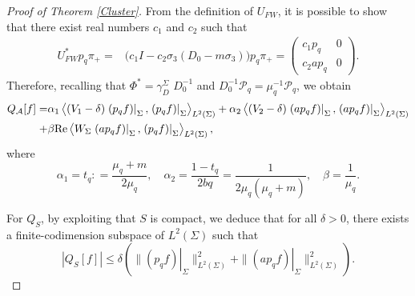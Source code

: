\documentclass[11pt,a4paper,reqno,oneside]{amsproc}
\numberwithin{equation}{section}
\begin{document}
\begin{proof}[Proof of Theorem \ref{Cluster}]
From the definition of $U_{FW}$, it is possible to show that there exist real numbers $c_1$ and $c_2$ such that
\begin{align*}
{U}_{FW}^* {p}_q \pi_+=&
\bigl(c_1 I - c_2 \sigma_3 (D_0 - m \sigma_3)\bigr)p_q \pi_+
=
\begin{pmatrix}
c_1p_q & 0 \\
c_2ap_q & 0
\end{pmatrix}.
\end{align*}
Therefore, recalling  that $\Phi^{*}=\gamma^\Sigma_D\,\,D_{0}^{-1}$ and $D_{0}^{-1}\mathcal{P}_q = \mu_q^{-1}\mathcal{P}_q$,  we obtain
\begin{align*}
Q_{\mathcal A}[f]
=&\alpha _1
\left\langle 
(V_1-\delta) \left.(p_q f)\right|_{\Sigma},
\left.(p_q f)\right|_{\Sigma}
\right\rangle_{L^2(\Sigma)}
+\alpha _2
\left\langle 
(V_2 -\delta) \left.(ap_q f)\right|_{\Sigma},
\left.(ap_q f)\right|_{\Sigma}
\right\rangle_{L^2(\Sigma)}\\
+&{\beta}
{\rm Re}
\left\langle 
W_\Sigma \left.(ap_q f)\right|_{\Sigma},
\left.(p_q f)\right|_{\Sigma}
\right\rangle_{L^2(\Sigma)},
\end{align*}
where 
\[
\alpha_1 = t_q : = \frac{\mu_q+m}{2\mu_q}, \quad 
\alpha_2 = \frac{1-t_q}{2bq} = \frac{1}{2\mu_q(\mu_q+m)}, \quad 
\beta = \frac{1}{\mu_q}.
\]

For $Q_S$, by exploiting that $S$ is compact, we deduce that for all $\delta>0$, there exists a finite-codimension subspace of $L^2(\Sigma)$ such that
\begin{equation*}\label{12nov25b}
|Q_S[f]|\leq \delta ( \| \left.(p_q f)\right|_\Sigma\|_{L^2(\Sigma)}^2 + \| \left.(a p_q f)\right|_\Sigma\|_{L^2(\Sigma)}^2).
\end{equation*}






\end{proof}
\end{document}

